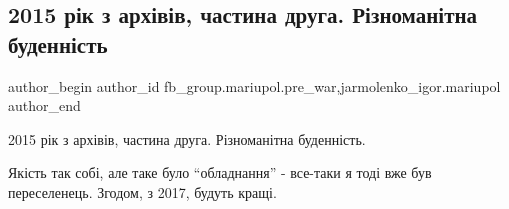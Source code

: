  
 
 
 
 

\subsection{2015 рік з архівів, частина друга. Різноманітна буденність}
\label{sec:12_01_2023.fb.fb_group.mariupol.pre_war.1.2015_r_k_z_arkh_v_v_}
 
\ifcmt
 author_begin
   author_id fb_group.mariupol.pre_war,jarmolenko_igor.mariupol
 author_end
\fi

2015 рік з архівів, частина друга. Різноманітна буденність.

Якість так собі, але таке було \enquote{обладнання} - все-таки я тоді вже був
переселенець. Згодом, з 2017, будуть кращі.
